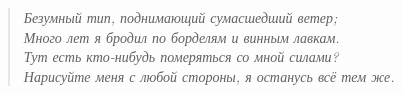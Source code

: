 \begin{ver}[1]
  \begin{verse}\it
    Безумный тип, поднимающий сумасшедший ветер;\\
    Много лет я бродил по борделям и винным лавкам.\\
    Тут есть кто-нибудь померяться со мной силами?\\
    Нарисуйте меня с любой стороны, я останусь всё тем же.
  \end{verse}
\end{ver}

